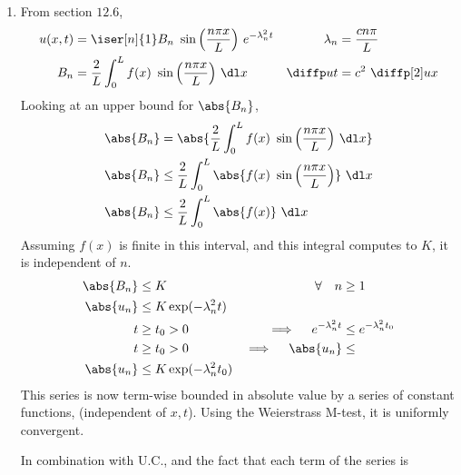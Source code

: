 \begin{enumerate}
    \item From section $ 12.6 $,
          \begin{align}
              u(x, t)              & = \iser[n]{1} B_n\ \sin\Big(
              \frac{n\pi x}{L}\Big)
              \ e^{-\lambda_n^2 t} &
              \lambda_n            & = \frac{cn\pi}{L}              \\
              B_n                  & = \frac{2}{L} \int_{0}^{L}f(x)
              \ \sin\Big(\frac{n\pi x}{L} \Big)
              \ \dl x              &
              \diffp ut            & = c^2\ \diffp[2] ux
          \end{align}
          Looking at an upper bound for $ \abs{B_n} $,
          \begin{align}
              \abs{B_n} & = \abs{\frac{2}{L}
              \int_{0}^{L}f(x)\ \sin\Big(\frac{n\pi x}{L} \Big) \ \dl x}       \\
              \abs{B_n} & \leq \frac{2}{L}
              \int_{0}^{L} \abs{f(x)\ \sin\Big(\frac{n\pi x}{L} \Big)} \ \dl x \\
              \abs{B_n} & \leq \frac{2}{L} \int_{0}^{L} \abs{f(x)}\ \dl x
          \end{align}
          Assuming $ f(x) $ is finite in this interval, and this integral computes to
          $ K $, it is independent of $ n $.
          \begin{align}
              \abs{B_n}                         & \leq K                        &
              \forall \quad n                   & \geq 1                          \\
              \abs{u_n}                         & \leq K \exp(-\lambda_n^2 t)     \\
              t                                 & \geq t_0 > 0                  &
              \implies \quad e^{-\lambda_n^2 t} & \leq e^{-\lambda_n^2 t_0}       \\
              t                                 & \geq t_0 > 0                  &
              \implies \quad \abs{u_n}          & \leq                            \\
              \abs{u_n}                         & \leq K \exp(-\lambda_n^2 t_0)
          \end{align}
          This series is now term-wise bounded in absolute value by a series of
          constant functions, (independent of $ x, t $). Using the Weierstrass M-test,
          it is uniformly convergent. \par
          In combination with U.C., and the fact that each term of the series is

\end{enumerate}
